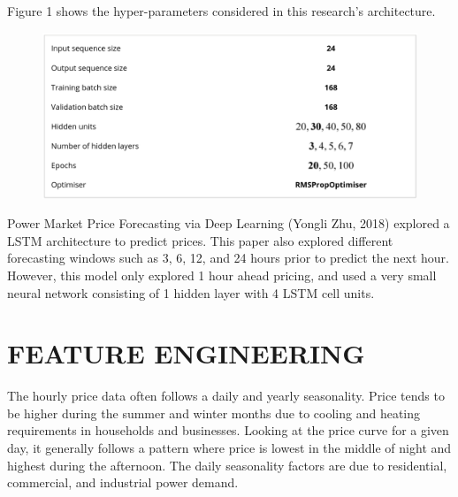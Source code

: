 \documentclass[9pt,a4paper,twoside]{rho}
\begin{document}
\noindent Figure 1 shows the hyper-parameters considered in this research's architecture.
\begin{figure}[H]
	\centering
	\includegraphics[width=0.8\columnwidth]{Figures/Research1.png}
\end{figure}

\noindent Power Market Price Forecasting via Deep Learning (Yongli Zhu, 2018) explored a LSTM architecture to predict prices. This paper also explored different forecasting windows such as 3, 6, 12, and 24 hours prior to predict the next hour. However, this model only explored 1 hour ahead pricing, and used a very small neural network consisting of 1 hidden layer with 4 LSTM cell units.

\vspace{-5em}

\section*{FEATURE ENGINEERING}

The hourly price data often follows a daily and yearly seasonality. Price tends to be higher during the summer and winter months due to cooling and heating requirements in households and businesses. Looking at the price curve for a given day, it generally follows a pattern where price is lowest in the middle of night and highest during the afternoon. The daily seasonality factors are due to residential, commercial, and industrial power demand.

\vspace{-4em}
\end{document}
